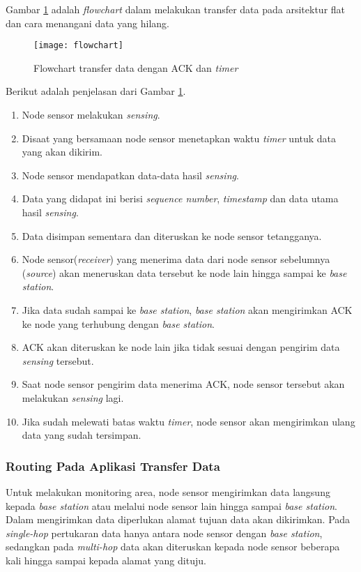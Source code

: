 Gambar \ref{fig:flowchart} adalah \textit{flowchart} dalam melakukan transfer data pada arsitektur flat dan cara menangani data yang hilang.

\begin{figure}[htbp]
	\centering
	\texttt{[image: flowchart]}
	\caption{Flowchart transfer data dengan ACK dan \textit{timer}}
	\label{fig:flowchart}
\end{figure}

Berikut adalah penjelasan dari Gambar \ref{fig:flowchart}.
\begin{enumerate}
	\item Node sensor melakukan \textit{sensing}.
	\item Disaat yang bersamaan node sensor menetapkan waktu \textit{timer} untuk data yang akan dikirim.
	\item Node sensor mendapatkan data-data hasil \textit{sensing}.
	\item Data yang didapat ini berisi \textit{sequence number}, \textit{timestamp} dan data utama hasil \textit{sensing}.
	\item Data disimpan sementara dan diteruskan ke node sensor tetangganya.
	\item Node sensor(\textit{receiver}) yang menerima data dari node sensor sebelumnya (\textit{source}) akan meneruskan data tersebut ke node lain hingga sampai ke \textit{base station}.
	\item Jika data sudah sampai ke \textit{base station}, \textit{base station} akan mengirimkan ACK ke node yang terhubung dengan \textit{base station}.
	\item ACK akan diteruskan ke node lain jika tidak sesuai dengan pengirim data \textit{sensing} tersebut.
	\item Saat node sensor pengirim data menerima ACK, node sensor tersebut akan melakukan \textit{sensing} lagi.
	\item Jika sudah melewati batas waktu \textit{timer}, node sensor akan mengirimkan ulang data yang sudah tersimpan.
\end{enumerate}

\subsubsection{Routing Pada Aplikasi Transfer Data}
\label{subsec:routing}
Untuk melakukan monitoring area, node sensor mengirimkan data langsung kepada \textit{base station} atau melalui node sensor lain hingga sampai \textit{base station}. Dalam mengirimkan data diperlukan alamat tujuan data akan dikirimkan. Pada \textit{single-hop} pertukaran data hanya antara node sensor dengan \textit{base station}, sedangkan pada \textit{multi-hop} data akan diteruskan kepada node sensor beberapa kali hingga sampai kepada alamat yang dituju. 

